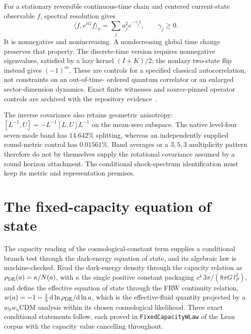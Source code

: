 \documentclass[11pt]{article}
\theoremstyle{remark}
\begin{document}
For a stationary reversible continuous-time chain and centered
current-state observable \(f\), spectral resolution gives
\[
 \langle f,e^{tG}f\rangle_\pi=\sum_j a_j^2e^{-\gamma_jt},
 \qquad \gamma_j\ge0.
\]
It is nonnegative and nonincreasing. A nondecreasing global time change
preserves that property. The discrete-time version requires nonnegative
eigenvalues, satisfied by a lazy kernel \((I+K)/2\); the nonlazy
two-state flip instead gives \((-1)^m\). These are controls for a
specified classical autocorrelation, not constraints on an out-of-time-
ordered quantum correlator or an enlarged sector-dimension dynamics.
Exact finite witnesses and source-pinned operator controls are archived
with the repository evidence~\cite{ophdynamicsevidence}.

The inverse covariance also retains geometric anisotropy:
\([L^{-1},U]=-L^{-1}[L,U]L^{-1}\) on the mean-zero subspace.
The native level-four seven-mode band has \(14.642\%\) splitting,
whereas an independently supplied round-metric control has \(0.01561\%\).
Band averages or a \(3,5,3\) multiplicity pattern therefore do not
by themselves supply the rotational covariance assumed by a round
horizon attachment. The conditional shock-spectrum identification must
keep its metric and representation premises.

\section{The fixed-capacity equation of state}

The capacity reading of the cosmological-constant term supplies a
conditional branch test through the dark-energy equation of state, and its
algebraic law is machine-checked. Read the
dark-energy density through the capacity relation as
\(\rho_{\rm DE}(a)=\kappa/N(a)\), with \(\kappa\) the single positive
constant packaging \(c^4\,3\pi/(8\pi G\,l_P^2)\), and define the effective
equation of state through the FRW continuity relation,
\(w(a)=-1-\tfrac13\,\mathrm d\ln\rho_{\rm DE}/\mathrm d\ln a\), which is
the effective-fluid quantity projected by a \(w_0w_a\mathrm{CDM}\)
analysis within its chosen cosmological likelihood. Three exact
conditional statements follow, each proved in
\texttt{FixedCapacityWLaw} of the Lean corpus with the capacity value
cancelling throughout.
\end{document}
